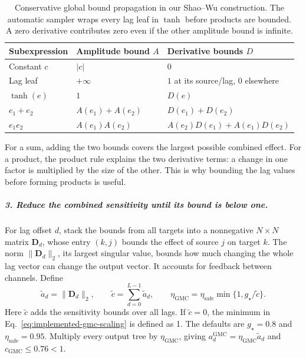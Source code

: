 \begin{table}[H]
\centering\small
\begin{tabular}{@{}lll@{}}
\toprule
Subexpression & Amplitude bound $A$ & Derivative bounds $D$ \\
\midrule
Constant $c$ & $|c|$ & $0$ \\
Lag leaf & $+\infty$ & $1$ at its source/lag, $0$ elsewhere \\
$\tanh(e)$ & $1$ & $D(e)$ \\
$e_1+e_2$ & $A(e_1)+A(e_2)$ & $D(e_1)+D(e_2)$ \\
$e_1e_2$ & $A(e_1)A(e_2)$ & $A(e_2)D(e_1)+A(e_1)D(e_2)$ \\
\bottomrule
\end{tabular}
\caption{Conservative global bound propagation in our Shao--Wu construction.
The automatic sampler wraps every lag leaf in $\tanh$ before products are
bounded. A zero derivative contributes zero even if the other amplitude
bound is infinite.}
\label{tab:ast-global-bounds}
\end{table}

For a sum, adding the two bounds covers the largest possible combined effect.
For a product, the product rule explains the two derivative terms: a change
in one factor is multiplied by the size of the other. This is why bounding
the lag values before forming products is useful.

\subparagraph{3. Reduce the combined sensitivity until its bound is below one.}
For lag offset $d$, stack the bounds from all targets into a nonnegative
$N\times N$ matrix $\mathbf D_d$, whose entry $(k,j)$ bounds the effect of
source $j$ on target $k$. The norm $\|\mathbf D_d\|_2$, its largest singular
value, bounds how much changing the whole lag vector can change the output
vector. It accounts for feedback between channels. Define
\begin{equation}
 \widetilde a_d=\|\mathbf D_d\|_2,\qquad
 \widetilde c=\sum_{d=0}^{L-1}\widetilde a_d,
 \qquad
 \eta_{\mathrm{GMC}}=
 \eta_{\mathrm{safe}}\min\{1,g_\star/\widetilde c\}.
 \label{eq:implemented-gmc-scaling}
\end{equation}
Here $\widetilde c$ adds the sensitivity bounds over all lags. If
$\widetilde c=0$, the
minimum in Eq.~\eqref{eq:implemented-gmc-scaling} is defined as 1. The
defaults are $g_\star=0.8$ and $\eta_{\mathrm{safe}}=0.95$.
Multiply every output tree by $\eta_{\mathrm{GMC}}$, giving
$a_d^{\mathrm{GMC}}=\eta_{\mathrm{GMC}}\widetilde a_d$ and
$c_{\mathrm{GMC}}\leq0.76<1$.


